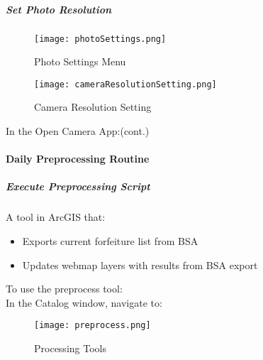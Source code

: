 {\LARGE\noindent{}  \lookArrow}
\vspace{3in}

{\LARGE\noindent{}  \lookArrow}
\clearpage
\subparagraph*{Set Photo Resolution}
\begin{wrapfigure}{r}{0.5\textwidth}
\centering
    \texttt{[image: photoSettings.png]}
\vspace{-.1in}

\caption{Photo Settings Menu}

\vspace{-.1in}

\HRule %
\vspace{.05in}

    \texttt{[image: cameraResolutionSetting.png]}
\vspace{-.1in}

\caption{Camera Resolution Setting}
\end{wrapfigure}
In the Open Camera App:{\tiny (cont.)}
\vspace{.2in}

{\LARGE\noindent{}  \lookArrow}
\vspace{6.5in}

{\LARGE\noindent{}  \lookArrow}
\clearpage
\paragraph{Daily Preprocessing Routine}
\subparagraph{Execute Preprocessing Script}A tool in ArcGIS that:
\begin{itemize}
\item Exports current forfeiture list from BSA
\item Updates webmap layers with results from BSA export
\end{itemize}
To use the preprocess tool:\\
In the Catalog window, navigate to:

{\scriptsize{}}

%
%
\begin{wrapfigure}{r}{0.5\textwidth}
\centering
    \texttt{[image: preprocess.png]}
\vspace{-.1in}

\caption{Processing Tools}
\end{wrapfigure}
\vspace{2in}

